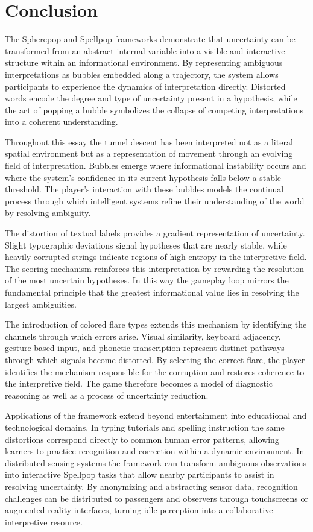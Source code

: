 \documentclass[11pt]{article}
\begin{document}
\section{Conclusion}

The Spherepop and Spellpop frameworks demonstrate that uncertainty can be transformed from an abstract internal variable into a visible and interactive structure within an informational environment. By representing ambiguous interpretations as bubbles embedded along a trajectory, the system allows participants to experience the dynamics of interpretation directly. Distorted words encode the degree and type of uncertainty present in a hypothesis, while the act of popping a bubble symbolizes the collapse of competing interpretations into a coherent understanding.

Throughout this essay the tunnel descent has been interpreted not as a literal spatial environment but as a representation of movement through an evolving field of interpretation. Bubbles emerge where informational instability occurs and where the system's confidence in its current hypothesis falls below a stable threshold. The player's interaction with these bubbles models the continual process through which intelligent systems refine their understanding of the world by resolving ambiguity.

The distortion of textual labels provides a gradient representation of uncertainty. Slight typographic deviations signal hypotheses that are nearly stable, while heavily corrupted strings indicate regions of high entropy in the interpretive field. The scoring mechanism reinforces this interpretation by rewarding the resolution of the most uncertain hypotheses. In this way the gameplay loop mirrors the fundamental principle that the greatest informational value lies in resolving the largest ambiguities.

The introduction of colored flare types extends this mechanism by identifying the channels through which errors arise. Visual similarity, keyboard adjacency, gesture-based input, and phonetic transcription represent distinct pathways through which signals become distorted. By selecting the correct flare, the player identifies the mechanism responsible for the corruption and restores coherence to the interpretive field. The game therefore becomes a model of diagnostic reasoning as well as a process of uncertainty reduction.

Applications of the framework extend beyond entertainment into educational and technological domains. In typing tutorials and spelling instruction the same distortions correspond directly to common human error patterns, allowing learners to practice recognition and correction within a dynamic environment. In distributed sensing systems the framework can transform ambiguous observations into interactive Spellpop tasks that allow nearby participants to assist in resolving uncertainty. By anonymizing and abstracting sensor data, recognition challenges can be distributed to passengers and observers through touchscreens or augmented reality interfaces, turning idle perception into a collaborative interpretive resource.
\end{document}
